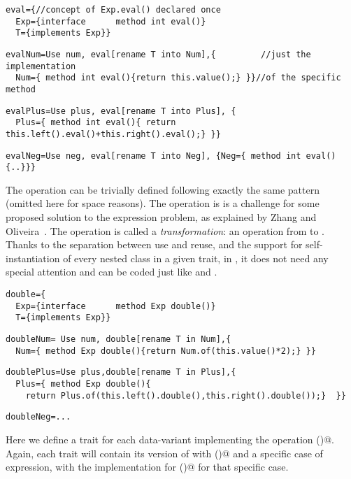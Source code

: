 \begin{lstlisting}
eval={//concept of Exp.eval() declared once
  Exp={interface      method int eval()}
  T={implements Exp}}
\end{lstlisting}
\multiCode
\begin{lstlisting}
evalNum=Use num, eval[rename T into Num],{         //just the implementation
  Num={ method int eval(){return this.value();} }}//of the specific method
\end{lstlisting}
\multiCode
\begin{lstlisting}
evalPlus=Use plus, eval[rename T into Plus], {
  Plus={ method int eval(){ return this.left().eval()+this.right().eval();} }}
\end{lstlisting}
\multiCode
\begin{lstlisting}
evalNeg=Use neg, eval[rename T into Neg], {Neg={ method int eval(){..}}}
\end{lstlisting}

The \Q@show@ operation can be trivially defined
following exactly the same pattern (omitted here for space reasons).
The operation \Q@double@ is is a challenge for some proposed solution
to the expression problem, as explained by Zhang and Oliveira~\cite{zhang2017evf}.
The \Q@double@ operation is called a \emph{transformation}: an operation from \Q@Exp@ to \Q@Exp@.
Thanks to the separation between use and reuse, and the support
for self-instantiation of every nested class in a given trait,
in \name, it does not need any special attention
and can be coded just like \Q@eval@ and \Q@show@.
\begin{lstlisting}
double={
  Exp={interface      method Exp double()}
  T={implements Exp}}
\end{lstlisting}
\multiCode
\begin{lstlisting}
doubleNum= Use num, double[rename T in Num],{
  Num={ method Exp double(){return Num.of(this.value()*2);} }}
\end{lstlisting}
\multiCode
\begin{lstlisting}
doublePlus=Use plus,double[rename T in Plus],{
  Plus={ method Exp double(){
    return Plus.of(this.left().double(),this.right().double());}  }}
\end{lstlisting}
\multiCode
\begin{lstlisting}
doubleNeg=...
\end{lstlisting}
Here we define a trait for each data-variant implementing the operation \Q@double()@.
Again, each trait will contain its version of \Q@Exp@ with \Q@double()@
and a specific case of expression, with the implementation for \Q@double()@
for that specific case.

